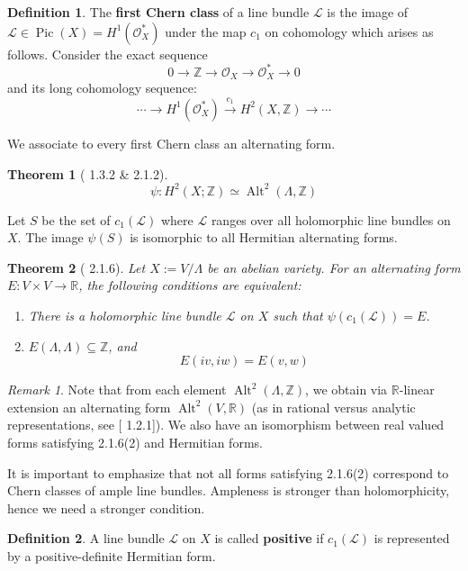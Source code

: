 \documentclass[12pt,reqno]{amsart}
\DeclareMathOperator{\Alt}{Alt}
\DeclareMathOperator{\Pic}{Pic}
\newcommand{\Z}{\mathbb{Z}}
\newcommand{\R}{\mathbb{R}}
\newcommand{\mc}{\mathcal}
\newtheorem*{thm*}{Theorem}
\theoremstyle{definition}
\newtheorem{defn}{Definition}
\theoremstyle{remark}
\newtheorem*{remark}{Remark}
\begin{document}
\begin{defn} The \textbf{first Chern class} of a line bundle $\mc{L}$ is the image of $\mc{L} \in \Pic(X) = H^1(\mc{O}_X^*)$ under the map $c_1$ on cohomology which arises as follows. Consider the exact sequence $$0 \to \Z \to \mc{O}_X \to \mc{O}_X^* \to 0$$ and its long cohomology sequence:
$$\cdots \to H^1(\mc{O}_X^*) \xrightarrow{c_1} H^2(X, \Z) \to \cdots$$ \end{defn} 

\noindent We associate to every first Chern class an alternating form.

\begin{thm*} [\cite{bl} 1.3.2 \& 2.1.2] $$\psi: H^2(X; \Z) \simeq \Alt^2(\Lambda, \Z)$$ 
\end{thm*} 
 
Let $S$ be the set of $c_1(\mc{L})$ where $\mc{L}$ ranges over all holomorphic line bundles on $X$. The image $\psi(S)$ is isomorphic to all Hermitian alternating forms.

\begin{thm*} [\cite{bl} 2.1.6] Let $X:= V/\Lambda$ be an abelian variety. For an alternating form $E: V \times V \to \R$, the following conditions are equivalent: 

\begin{enumerate} 
\item There is a holomorphic line bundle $\mc{L}$ on $X$ such that $\psi(c_1(\mc{L}))= E$. 
\item $E(\Lambda, \Lambda) \subseteq \Z$, and $$E(iv, iw) = E(v, w)$$
\end{enumerate}
\end{thm*} 

 
\begin{remark} Note that from each element $\Alt^2(\Lambda, \Z)$, we obtain via $\R$-linear extension an alternating form $\Alt^2(V, \R)$ (as in rational versus analytic representations, see [\cite{bl} 1.2.1]). We also have an isomorphism between real valued forms satisfying 2.1.6(2) and Hermitian forms. \end{remark}

It is important to emphasize that not all forms satisfying 2.1.6(2) correspond to Chern classes of ample line bundles. Ampleness is stronger than holomorphicity, hence we need a stronger condition. 

\begin{defn} 
A line bundle $\mc{L}$ on $X$ is called \textbf{positive} if $c_1(\mc{L})$ is represented by a positive-definite Hermitian form.
\end{defn}
\end{document}
